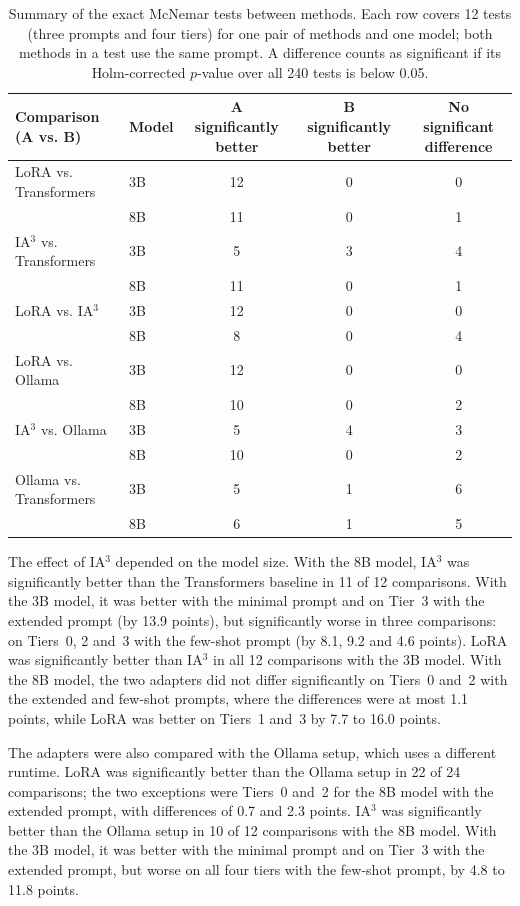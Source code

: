 \documentclass[journal,article,submit,pdftex,moreauthors]{Definitions/mdpi}
\begin{document}
\begin{table}[H]
\caption{Summary of the exact McNemar tests between methods. Each row covers 12 tests (three prompts and four tiers) for one pair of methods and one model; both methods in a test use the same prompt. A difference counts as significant if its Holm-corrected $p$-value over all 240 tests is below 0.05.\label{tab:mcnemar}}
\begin{tabularx}{\textwidth}{llCCC}
\toprule
Comparison (A vs. B) & Model & A significantly better & B significantly better & No significant difference \\
\midrule
LoRA vs. Transformers & 3B & 12 & 0 & 0 \\
 & 8B & 11 & 0 & 1 \\
\midrule
IA$^3$ vs. Transformers & 3B & 5 & 3 & 4 \\
 & 8B & 11 & 0 & 1 \\
\midrule
LoRA vs. IA$^3$ & 3B & 12 & 0 & 0 \\
 & 8B & 8 & 0 & 4 \\
\midrule
LoRA vs. Ollama & 3B & 12 & 0 & 0 \\
 & 8B & 10 & 0 & 2 \\
\midrule
IA$^3$ vs. Ollama & 3B & 5 & 4 & 3 \\
 & 8B & 10 & 0 & 2 \\
\midrule
Ollama vs. Transformers & 3B & 5 & 1 & 6 \\
 & 8B & 6 & 1 & 5 \\
\bottomrule
\end{tabularx}
\end{table}

The effect of IA$^3$ depended on the model size. With the 8B model, IA$^3$ was significantly better than the Transformers baseline in 11 of 12 comparisons. With the 3B model, it was better with the minimal prompt and on Tier~3 with the extended prompt (by 13.9 points), but significantly worse in three comparisons: on Tiers~0, 2 and~3 with the few-shot prompt (by 8.1, 9.2 and 4.6 points). LoRA was significantly better than IA$^3$ in all 12 comparisons with the 3B model. With the 8B model, the two adapters did not differ significantly on Tiers~0 and~2 with the extended and few-shot prompts, where the differences were at most 1.1 points, while LoRA was better on Tiers~1 and~3 by 7.7 to 16.0 points.

The adapters were also compared with the Ollama setup, which uses a different runtime. LoRA was significantly better than the Ollama setup in 22 of 24 comparisons; the two exceptions were Tiers~0 and~2 for the 8B model with the extended prompt, with differences of 0.7 and 2.3 points. IA$^3$ was significantly better than the Ollama setup in 10 of 12 comparisons with the 8B model. With the 3B model, it was better with the minimal prompt and on Tier~3 with the extended prompt, but worse on all four tiers with the few-shot prompt, by 4.8 to 11.8 points.
\end{document}

